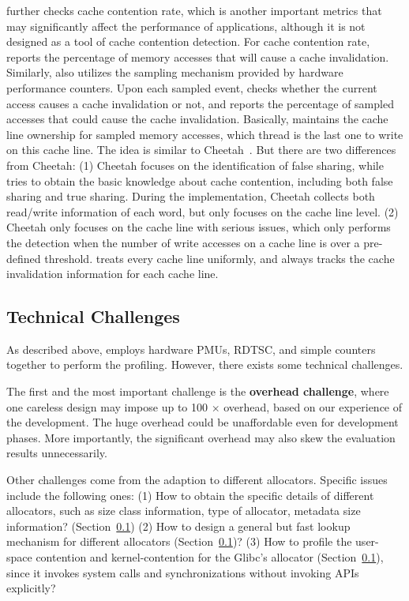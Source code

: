 \MP{} further checks cache contention rate, which is another important metrics that may significantly affect the performance of applications, although it is not designed as a tool of cache contention detection. For cache contention rate, \MP{} reports the percentage of memory accesses that will cause a cache invalidation.  Similarly, \MP{} also utilizes the sampling mechanism provided by hardware performance counters. Upon each sampled event, \MP{} checks whether the current access causes a cache invalidation or not, and reports the percentage of sampled accesses that could cause the cache invalidation. Basically, \MP{} maintains the cache line ownership for sampled memory accesses, which thread is the last one to write on this cache line. The idea is similar to Cheetah~\cite{Cheetah}. But there are two differences from Cheetah: (1) Cheetah focuses on the identification of false sharing, while \MP{} tries to obtain the basic knowledge about cache contention, including both false sharing and true sharing. During the implementation, Cheetah collects both read/write information of each word, but \MP{} only focuses on the cache line level. (2)  Cheetah only focuses on the cache line with serious issues, which only performs the detection when the number of write accesses on a cache line is over a pre-defined threshold. \MP{} treats every cache line uniformly, and always tracks the cache invalidation information for each cache line. 

\subsection{Technical Challenges}

As described above, \MP{} employs hardware PMUs, RDTSC, and simple counters together to perform the profiling. However, there exists some technical challenges. 

The first and the most important challenge is the \textbf{overhead challenge}, where one careless design may impose up to 100 $\times$ overhead, based on our experience of the development. The huge overhead could be unaffordable even for development phases. More importantly, the significant overhead may also skew the evaluation results unnecessarily.

Other challenges come from the adaption to different allocators. Specific issues include the following ones: (1) How to obtain the specific details of different allocators, such as size class information, type of allocator, metadata size information? (Section~\ref{}) (2) How to design a general but fast lookup mechanism for different allocators (Section~\ref{})? (3) How to profile the user-space contention and kernel-contention for the Glibc's allocator (Section~\ref{}), since it invokes system calls and synchronizations without invoking APIs explicitly?


